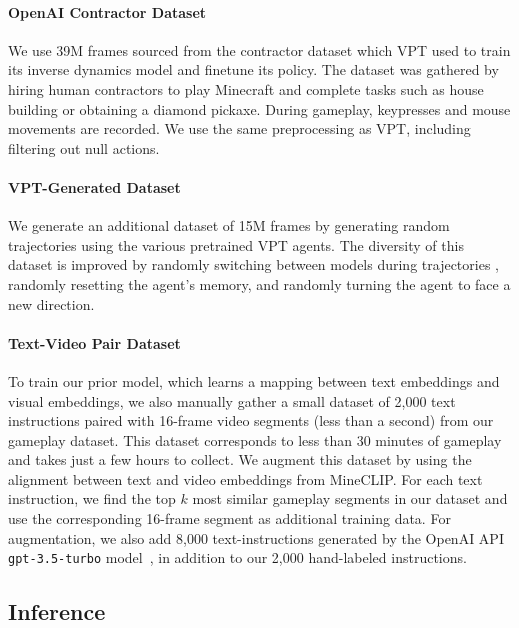 \paragraph{OpenAI Contractor Dataset} We use 39M frames sourced from the contractor dataset which VPT \citep{baker2022vpt} used to train its inverse dynamics model and finetune its policy. The dataset was gathered by hiring human contractors to play Minecraft and complete tasks such as house building or obtaining a diamond pickaxe. During gameplay, keypresses and mouse movements are recorded. We use the same preprocessing as VPT, including filtering out null actions.

\paragraph{VPT-Generated Dataset} We generate an additional dataset of 15M frames by generating random trajectories using the various pretrained VPT agents. The diversity of this dataset is improved by randomly switching between models during trajectories \citep{paster2022return}, randomly resetting the agent's memory, and randomly turning the agent to face a new direction.

\paragraph{Text-Video Pair Dataset} To train our prior model, which learns a mapping between text embeddings and visual embeddings, we also manually gather a small dataset of 2,000 text instructions paired with 16-frame video segments (less than a second) from our gameplay dataset. This dataset corresponds to less than 30 minutes of gameplay and takes just a few hours to collect. We augment this dataset by using the alignment between text and video embeddings from MineCLIP. For each text instruction, we find the top $k$ most similar gameplay segments in our dataset and use the corresponding 16-frame segment as additional training data. For augmentation, we also add 8,000 text-instructions generated by the OpenAI API \texttt{gpt-3.5-turbo} model~\citep{chatgpt}, in addition to our 2,000 hand-labeled instructions.

\subsection{Inference}
\label{sec:inference}

